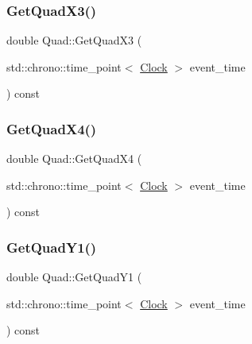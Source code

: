 \mbox{\label{classQuad_aaa044d9683717efd054d82f553b3337d}} 
\subsubsection{\texorpdfstring{Get\+Quad\+X3()}{GetQuadX3()}}
{\footnotesize\ttfamily double Quad\+::\+Get\+Quad\+X3 (\begin{DoxyParamCaption}\item[{std\+::chrono\+::time\+\_\+point$<$ \mbox{\hyperlink{universe_8h_a0ef8d951d1ca5ab3cfaf7ab4c7a6fd80}{Clock}} $>$}]{event\+\_\+time }\end{DoxyParamCaption}) const\hspace{0.3cm}{\ttfamily [inline]}}

\mbox{\label{classQuad_a07884076387e255aa09ca8b0ac7ff599}} 
\subsubsection{\texorpdfstring{Get\+Quad\+X4()}{GetQuadX4()}}
{\footnotesize\ttfamily double Quad\+::\+Get\+Quad\+X4 (\begin{DoxyParamCaption}\item[{std\+::chrono\+::time\+\_\+point$<$ \mbox{\hyperlink{universe_8h_a0ef8d951d1ca5ab3cfaf7ab4c7a6fd80}{Clock}} $>$}]{event\+\_\+time }\end{DoxyParamCaption}) const\hspace{0.3cm}{\ttfamily [inline]}}

\mbox{\label{classQuad_ac7b0d27994149531dcd81eacca4e1a5c}} 
\subsubsection{\texorpdfstring{Get\+Quad\+Y1()}{GetQuadY1()}}
{\footnotesize\ttfamily double Quad\+::\+Get\+Quad\+Y1 (\begin{DoxyParamCaption}\item[{std\+::chrono\+::time\+\_\+point$<$ \mbox{\hyperlink{universe_8h_a0ef8d951d1ca5ab3cfaf7ab4c7a6fd80}{Clock}} $>$}]{event\+\_\+time }\end{DoxyParamCaption}) const\hspace{0.3cm}{\ttfamily [inline]}}

